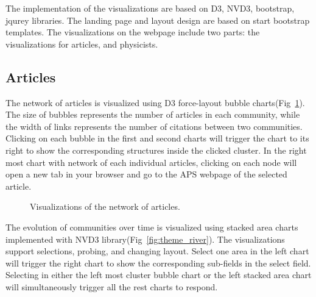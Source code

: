 \documentclass{article} %
\begin{document}
The implementation of the visualizations are based on D3, NVD3, bootstrap, jqurey libraries. The landing page and layout design are based on start bootstrap templates. The visualizations on the webpage include two parts: the visualizations for articles, and physicists.

\subsection{Articles}
The network of articles is visualized using D3 force-layout bubble charts(Fig~\ref{fig:cluster_whole}). The size of bubbles represents the number of articles in each community, while the width of links represents the number of citations between two communities. Clicking on each bubble in the first and second charts will trigger the chart to its right to show the corresponding structures inside the clicked cluster. In the right most chart with network of each individual articles, clicking on each node will open a new tab in your browser and go to the APS webpage of the selected article.

\begin{figure}[h]
  	\centering
 	\caption{Visualizations of the network of articles.}
 	\vspace{-10pt}
  \label{fig:cluster_whole}
\end{figure}

The evolution of communities over time is visualized using stacked area charts implemented with NVD3 library(Fig~\ref{fig:theme_river}). The visualizations support selections, probing, and changing layout. Select one area in the left chart will trigger the right chart to show the corresponding sub-fields in the select field. Selecting in either the left most cluster bubble chart or the left stacked area chart will simultaneously trigger all the rest charts to respond.
\end{document}
